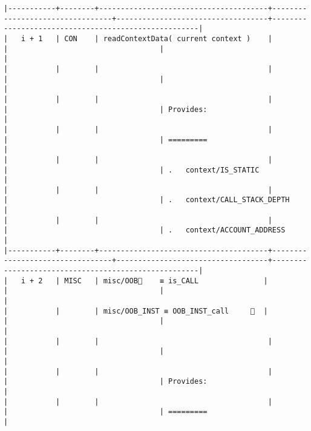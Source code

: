 \documentclass[varwidth=\maxdimen,margin=0.5cm,multi={verbatim}]{standalone}
\begin{document}
\begin{verbatim}
|-----------+--------+---------------------------------------+---------------------------------+-----------------------------------+-----------------------------------------------------|
|   i + 1   | CON    | readContextData( current context )    |                                 |                                   |                                                     |
|           |        |                                       |                                 |                                   |                                                     |
|           |        |                                       |                                 |                                   | Provides:                                           |
|           |        |                                       |                                 |                                   | =========                                           |
|           |        |                                       |                                 |                                   | .   context/IS_STATIC                               |
|           |        |                                       |                                 |                                   | .   context/CALL_STACK_DEPTH                        |
|           |        |                                       |                                 |                                   | .   context/ACCOUNT_ADDRESS                         |
|-----------+--------+---------------------------------------+---------------------------------+-----------------------------------+-----------------------------------------------------|
|   i + 2   | MISC   | misc/OOB🚩    ≡ is_CALL               |                                 |                                   |                                                     |
|           |        | misc/OOB_INST ≡ OOB_INST_call     👋  |                                 |                                   |                                                     |
|           |        |                                       |                                 |                                   |                                                     |
|           |        |                                       |                                 |                                   | Provides:                                           |
|           |        |                                       |                                 |                                   | =========                                           |

\end{verbatim}
\end{document}
